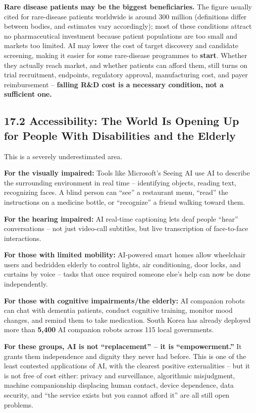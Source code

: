 \documentclass[11pt,a4paper]{article}
\begin{document}
\textbf{Rare disease patients may be the biggest beneficiaries.} The figure usually cited for rare-disease patients worldwide is around 300 million (definitions differ between bodies, and estimates vary accordingly); most of these conditions attract no pharmaceutical investment because patient populations are too small and markets too limited. AI may lower the cost of target discovery and candidate screening, making it easier for some rare-disease programmes to \textbf{start}. Whether they actually reach market, and whether patients can afford them, still turns on trial recruitment, endpoints, regulatory approval, manufacturing cost, and payer reimbursement -- \textbf{falling R\&D cost is a necessary condition, not a sufficient one.}

\subsection{17.2 Accessibility: The World Is Opening Up for People With Disabilities and the Elderly}

This is a severely underestimated area.

\textbf{For the visually impaired:} Tools like Microsoft's Seeing AI use AI to describe the surrounding environment in real time -- identifying objects, reading text, recognizing faces. A blind person can ``see'' a restaurant menu, ``read'' the instructions on a medicine bottle, or ``recognize'' a friend walking toward them.

\textbf{For the hearing impaired:} AI real-time captioning lets deaf people ``hear'' conversations -- not just video-call subtitles, but live transcription of face-to-face interactions.

\textbf{For those with limited mobility:} AI-powered smart homes allow wheelchair users and bedridden elderly to control lights, air conditioning, door locks, and curtains by voice -- tasks that once required someone else's help can now be done independently.

\textbf{For those with cognitive impairments/the elderly:} AI companion robots can chat with dementia patients, conduct cognitive training, monitor mood changes, and remind them to take medication. South Korea has already deployed more than \textbf{5,400} AI companion robots across 115 local governments.

\textbf{For these groups, AI is not ``replacement'' -- it is ``empowerment.''} It grants them independence and dignity they never had before. This is one of the least contested applications of AI, with the clearest positive externalities -- but it is not free of cost either: privacy and surveillance, algorithmic misjudgment, machine companionship displacing human contact, device dependence, data security, and ``the service exists but you cannot afford it'' are all still open problems.
\end{document}
